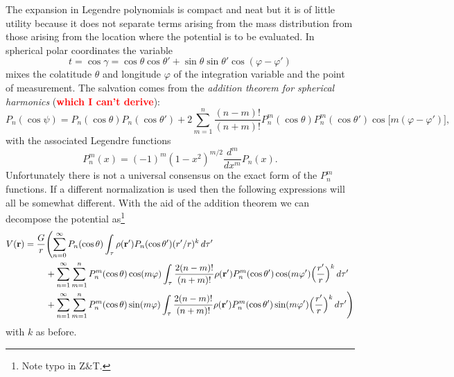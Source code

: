 \documentclass[amsmath,amsfonts,rmp,letterpaper]{revtex4}
\newcommand{\V}[1]{\mathbf{#1}} %
\newcommand{\arr}{\V{r}}
\newcommand{\arp}{\V{r'}}
\newcommand{\red}[1]{\textbf{\textcolor{red}{#1}}}
\begin{document}
The expansion in Legendre polynomials is compact and neat but it is of little
utility because it does not separate terms arising from the mass distribution from
those arising from the location where the potential is to be evaluated. In
spherical polar coordinates the variable
\begin{equation*}
t = \cos\gamma = \cos\theta\cos\theta' + \sin\theta\sin\theta'\cos(\varphi -
\varphi')
\end{equation*}
mixes the colatitude $\theta$ and longitude $\varphi$ of the integration
variable and the point of measurement. The salvation comes from the \emph{addition
theorem for spherical harmonics} (\red{which I can't derive}):
\begin{equation}\label{eq:addition}
P_n(\cos\psi) = P_n(\cos\theta)P_n(\cos\theta') +
2\sum_{m=1}^{n}\frac{(n - m)!}{(n + m)!}P_n^m(\cos\theta)P_n^m(\cos\theta')
\cos\bigl[m(\varphi - \varphi')\bigr],
\end{equation}
with the associated Legendre functions
\begin{equation}\label{eq:assoc_lege}
P_n^m(x) = (-1)^m(1 - x^2)^{m/2}\frac{d^m}{dx^m}P_n(x).
\end{equation}
Unfortunately there is not a universal consensus on the exact form of the $P_n^m$
functions. If a different normalization is used then the following expressions
will all be somewhat different. With the aid of the addition theorem we can
decompose the potential as\WarningsOff\footnote{Note typo in Z\&T.}\WarningsOn
\begin{equation}\label{eq:spherical_gravity}
\begin{split}
V(\arr) = \frac{G}{r}&\Biggl(
\sum_{n=0}^\infty{}P_n(\cos\theta)\int_\tau{}\rho(\arp)P_n(\cos\theta')
(r'/r)^k\,d\tau' \\
&+ \sum_{n=1}^{\infty}\sum_{m=1}^{n}P_n^m(\cos\theta)\cos(m\varphi)\int_\tau\frac
{2(n - m)!}{(n + m)!}\rho(\arp)P_n^m(\cos\theta')\cos(m\varphi')\Bigl(\frac
{r'}{r}\Bigr)^k\,d\tau' \\
&+ \sum_{n=1}^{\infty}\sum_{m=1}^{n}P_n^m(\cos\theta)\sin(m\varphi)\int_\tau\frac
{2(n - m)!}{(n + m)!}\rho(\arp)P_n^m(\cos\theta')\sin(m\varphi')\Bigl(\frac
{r'}{r}\Bigr)^k\,d\tau'
\Biggr)
\end{split}
\end{equation}
with $k$ as before.
\end{document}
